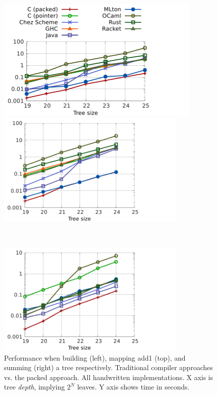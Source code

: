 \documentclass[a4paper,english]{lipics-v2016}
\begin{document}
\begin{figure}[t]
  \vspace{-4mm}
  \centering
  \hspace{12mm}
  \includegraphics[width=3.9in]{./figs/shootout_add1.pdf}

\begin{minipage}{1.00\textwidth}
\hspace{-4mm}      
  \begin{minipage}{.48\textwidth}
    \centering
    \includegraphics[width=3.6in]{./figs/shootout_buildtree.pdf}    
  \end{minipage}
  $ $
  \begin{minipage}{.48\textwidth}
    \centering
        \includegraphics[width=3.6in]{./figs/shootout_sumtree.pdf}
  \end{minipage}

\end{minipage}
  \caption{Performance when building (left), mapping add1 (top), and summing
    (right) a tree respectively.  Traditional compiler approaches vs. the packed
    approach.  All handwritten implementations.  X axis is tree {\em depth},
    implying $2^N$ leaves.  Y axis shows time in seconds.}
  \label{fig:shootout1}
\end{figure}
\end{document}
